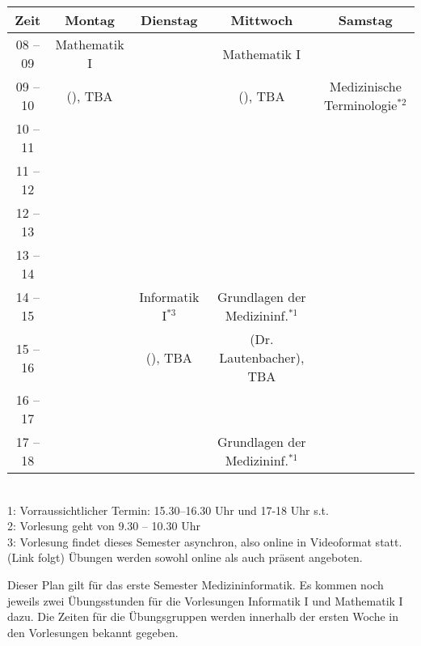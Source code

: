 \begin{minipage}{\textwidth}
    \footnotesize
\begin{center}
\begin{tabular}{|c|c|c|c|c|} 
	\hline
	Zeit    & Montag       & Dienstag             & Mittwoch                          & Samstag                           \\ 
	\hline\hline
	08 – 09 & Mathematik I &                      & Mathematik I                      &                                   \\ 
	\cline{1-1}\cline{3-3}\cline{5-5}
	09 – 10 & (), TBA      &                      & (), TBA                           & Medizinische Terminologie$^{*2}$  \\ 
	\hline
	10 – 11 &              &                      &                                   &                                   \\ 
	\cline{1-1}\cline{3-5}
	11 – 12 &              &                      &                                   &                                   \\ 
	\hline
	12 – 13 &              &                      &                                   &                                   \\ 
	\hline
	13 – 14 &              &                      &                                   &                                   \\ 
	\hline
	14 – 15 &              & Informatik I$^{*3}$  & Grundlagen der Medizininf.$^{*1}$ &                                   \\ 
	\cline{1-2}\cline{4-5}
	15 – 16 &              & (), TBA              & (Dr. Lautenbacher), TBA           &                                   \\ 
	\cline{1-3}\cline{5-5}
	16 – 17 &              &                      &                                   &                                   \\ 
	\hline
	17 – 18 &              &                      & Grundlagen der Medizininf.$^{*1}$ &                                   \\
	\hline
\end{tabular}
    ~\\
\scriptsize %
1: Vorraussichtlicher Termin: 15.30--16.30 Uhr und 17-18 Uhr s.t.\\
2: Vorlesung geht von 9.30 -- 10.30 Uhr\\
3: Vorlesung findet dieses Semester asynchron, also online in Videoformat statt. (Link folgt) Übungen werden sowohl online als auch präsent angeboten.
\end{center}
\end{minipage}
Dieser Plan gilt für das erste Semester Medizininformatik. Es kommen noch jeweils zwei Übungsstunden für die Vorlesungen 
Informatik I und Mathematik I dazu. Die Zeiten für die Übungsgruppen werden innerhalb der ersten Woche in den Vorlesungen bekannt gegeben.
